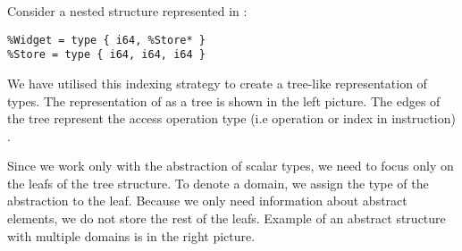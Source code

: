\begin{example} \label{ex:fieldtrie}
Consider a nested structure represented in \LLVMIR:
\begin{verbatim}
%Widget = type { i64, %Store* }
%Store = type { i64, i64, i64 }
\end{verbatim}

We have utilised this indexing strategy to create a tree-like representation
of types. The representation of  as a tree is shown in the
left picture. The edges of the tree represent the access operation type
(i.e  operation or index in  instruction)
\cite{LLVM:langref}.

Since we work only with the abstraction of scalar types, we need to focus only on
the leafs of the tree structure. To denote a domain, we assign the type of the
abstraction to the leaf. Because we only need information about abstract
elements, we do not store the rest of the leafs. Example of an abstract structure
with multiple domains is in the right picture.


\end{example}
